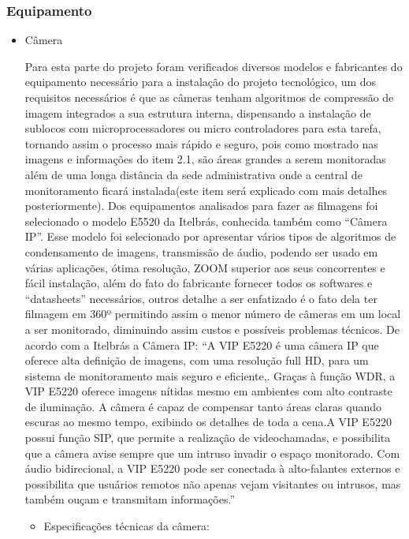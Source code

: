 \subsubsection{Equipamento}

\begin{itemize}
	\item Câmera
	
	Para esta parte do projeto foram verificados diversos modelos e fabricantes do equipamento necessário para a instalação do projeto tecnológico, um dos requisitos necessários é que as câmeras tenham algoritmos de compressão de imagem integrados a sua estrutura interna, dispensando a instalação de sublocos com microprocessadores ou micro controladores para esta tarefa, tornando assim o processo mais rápido e seguro, pois como  mostrado  nas imagens e informações do item 2.1, são áreas grandes a serem monitoradas além de uma longa distância da sede administrativa onde a central de monitoramento ficará instalada(este item será explicado com mais detalhes posteriormente). Dos equipamentos analisados para fazer as filmagens foi selecionado o modelo E5520 da Itelbrás, conhecida também como “Câmera IP”. Esse modelo foi selecionado  por apresentar  vários tipos de algoritmos de condensamento de imagens, transmissão de áudio, podendo ser usado em várias aplicações, ótima resolução, ZOOM superior aos seus concorrentes e fácil instalação, além do fato do fabricante fornecer todos os softwares e “datasheets” necessários, outros detalhe a ser enfatizado é o fato dela ter filmagem em 360º permitindo assim o menor número de câmeras em um local a ser monitorado, diminuindo assim custos e possíveis problemas técnicos. De acordo com a Itelbrás  a Câmera IP:
	“A VIP E5220 é uma câmera IP que oferece alta definição de imagens, com uma resolução full HD, para um sistema de monitoramento mais seguro e eficiente,. Graças à  função WDR, a VIP E5220 oferece imagens nítidas mesmo em ambientes com alto contraste de iluminação. A câmera é capaz de compensar tanto áreas claras quando escuras ao mesmo tempo, exibindo os detalhes de toda a cena.A VIP E5220 possui função SIP, que permite a realização de videochamadas, e possibilita que a câmera avise sempre que um intruso invadir o espaço monitorado. Com áudio bidirecional, a VIP E5220 pode ser conectada à  alto-falantes externos e possibilita que usuários remotos não apenas vejam visitantes ou intrusos, mas também ouçam e transmitam informações.”
	
	\begin{itemize}
		\item Especificações técnicas da câmera:
		

\end{itemize}
\end{itemize}

